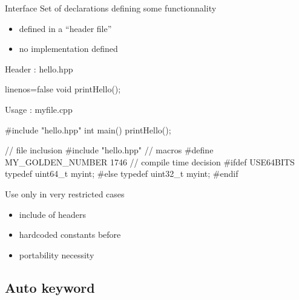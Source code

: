 \begin{frame}[fragile]
  \begin{block}{Interface}
    Set of declarations defining some functionnality
    \begin{itemize}
    \item defined in a ``header file''
    \item no implementation defined
    \end{itemize}
  \end{block}
  \begin{block}{Header : hello.hpp}
    \begin{cppcode*}{linenos=false}
      void printHello();
    \end{cppcode*}
  \end{block}
  \begin{block}{Usage : myfile.cpp}
    \begin{cppcode*}{}
      #include "hello.hpp"
      int main() {
        printHello();
      }
    \end{cppcode*}  
  \end{block}
\end{frame}

\begin{frame}[fragile]
  \begin{cppcode}
    // file inclusion
    #include "hello.hpp"
    // macros
    #define MY_GOLDEN_NUMBER 1746
    // compile time decision
    #ifdef USE64BITS
      typedef uint64_t myint;
    #else
      typedef uint32_t myint;
    #endif
  \end{cppcode}
  \pause
  \begin{block}{Use only in very restricted cases}
    \begin{itemize}
    \item include of headers
    \item hardcoded constants before 
    \item portability necessity
    \end{itemize}
  \end{block}
\end{frame}
\subsection[auto]{Auto keyword}

